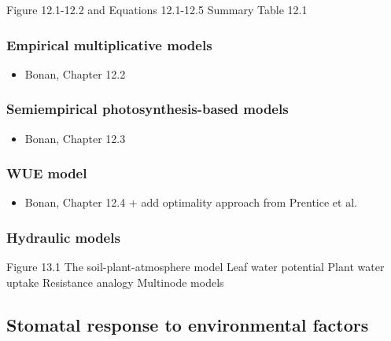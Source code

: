 \documentclass[
  oneside]{book}
\providecommand{\tightlist}{%
  \setlength{\itemsep}{0pt}\setlength{\parskip}{0pt}}
\begin{document}
Figure 12.1-12.2 and Equations 12.1-12.5
Summary Table 12.1

\hypertarget{empirical-multiplicative-models}{%
\subsubsection{Empirical multiplicative models}\label{empirical-multiplicative-models}}

\begin{itemize}
\tightlist
\item
  Bonan, Chapter 12.2
\end{itemize}

\hypertarget{semiempirical-photosynthesis-based-models}{%
\subsubsection{Semiempirical photosynthesis-based models}\label{semiempirical-photosynthesis-based-models}}

\begin{itemize}
\tightlist
\item
  Bonan, Chapter 12.3
\end{itemize}

\hypertarget{wue-model}{%
\subsubsection{WUE model}\label{wue-model}}

\begin{itemize}
\tightlist
\item
  Bonan, Chapter 12.4 + add optimality approach from Prentice et al.
\end{itemize}

\hypertarget{hydraulic-models}{%
\subsubsection{Hydraulic models}\label{hydraulic-models}}

Figure 13.1
The soil-plant-atmosphere model
Leaf water potential
Plant water uptake
Resistance analogy
Multinode models

\hypertarget{stomatal-response-to-environmental-factors}{%
\subsection{Stomatal response to environmental factors}\label{stomatal-response-to-environmental-factors}}
\end{document}
